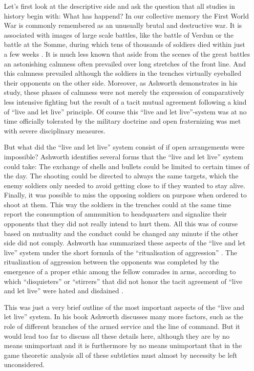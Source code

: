 Let's first look at the descriptive side and ask the question that all studies
in history begin with: What has happend? In our collective memory the First
World War is commonly remembered as an unusually brutal and destructive war.
It is associated with images of large scale battles, like the battle of Verdun
or the battle at the Somme, during which tens of thousands of soldiers died
within just a few weeks \cite[p.\  52]{james:2003}. It is much less known that
aside from the scenes of the great battles an astonishing calmness often
prevailed over long stretches of the front line. And this calmness prevailed
although the soldiers in the trenches virtually eyeballed their opponents on
the other side. Moreover, as Ashworth demonstrates in his study, these phases
of calmness were not merely the expression of comparatively less intensive
fighting but the result of a tacit mutual agreement following a kind of ``live
and let live'' principle. Of course this ``live and let live''-system was at
no time officially tolerated by the military doctrine and open fraternizing
was met with severe disciplinary measures.

But what did the ``live and let live'' system consist of if open
arrangements were impossible? Ashworth identifies several forms that the
``live and let live'' system could take: The exchange of shells and
bullets could be limited to certain times of the day. The shooting could
be directed to always the same targets, which the enemy soldiers only
needed to avoid getting close to if they wanted to stay alive.
Finally, it was possible to miss the opposing soldiers on purpose when
ordered to shoot at them. This way the soldiers in the trenches could at
the same time report the consumption of ammunition to headquarters and
signalize their opponents that they did not really intend to hurt
them. All this was of course based on mutuality and the conduct could
be changed any minute if the other side did not comply. Ashworth has
summarized these aspects of the ``live and let live'' system under the
short formula of the ``ritualisation of aggression''
\cite[p.\ 99ff.]{ashworth:1980}. The ritualization of aggression between
the opponents was completed by the emergence of a proper ethic among
the fellow comrades in arms, according to which ``disquieters'' or
``stirrers'' that did not honor the tacit agreement of ``live and let
live'' were hated and disdained \cite[p.\ 135ff.]{ashworth:1980}. 

This was just a very brief outline of the most important aspects of the
``live and let live'' system. In his book Ashworth discusses many more
factors, such as the role of different branches of the armed service and the
line of command. But it would lead too far to discuss all these details
here, although they are by no means unimportant and it is
furthermore by no means unimportant that in the game theoretic analysis
all of these subtleties must almost by necessity be left unconsidered.


